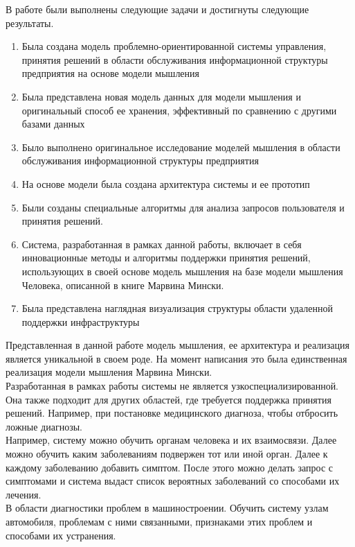 
В работе были выполнены следующие задачи и достигнуты следующие результаты.
\begin{enumerate}
  \item Была создана модель проблемно-ориентированной системы управления, принятия решений в области обслуживания информационной структуры предприятия на основе модели мышления
  \item Была представлена новая модель данных для модели мышления и оригинальный способ ее хранения, эффективный по сравнению с другими базами данных
  \item Было выполнено оригинальное исследование моделей мышления в области обслуживания информационной структуры предприятия
  \item На основе модели была создана архитектура системы и ее прототип 
  \item Были созданы специальные алгоритмы для анализа запросов пользователя и принятия решений. 
  \item Система, разработанная в рамках данной работы, включает в себя инновационные методы и алгоритмы поддержки принятия решений, использующих в своей основе модель мышления на базе модели мышления Человека, описанной в книге Марвина Мински. 
  \item Была представлена наглядная визуализация структуры области удаленной поддержки инфраструктуры
\end{enumerate}

Представленная в данной работе модель мышления, ее архитектура и реализация является уникальной в своем роде. На момент написания это была единственная реализация модели мышления Марвина Мински. \\
Разработанная в рамках работы системы не является узкоспециализированной. Она также подходит для других областей, где требуется поддержка принятия решений. Например, при постановке медицинского диагноза, чтобы отбросить ложные диагнозы. \\
Например, систему можно обучить органам человека и их взаимосвязи. Далее можно обучить каким заболеваниям подвержен тот или иной орган. Далее к каждому заболеванию добавить симптом. После этого можно делать запрос с симптомами и система выдаст список вероятных заболеваний со способами их лечения. \\
В области диагностики проблем в машиностроении. Обучить систему узлам автомобиля, проблемам с ними связанными, признаками этих проблем и способами их устранения. 



